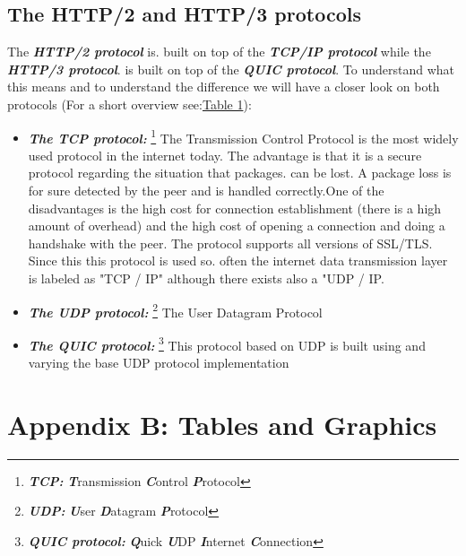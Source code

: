 \documentclass[10pt,a4paper,english]{article}
\newcommand{\abbrhighcol}[1]{\textbf{\textit{#1}}}
\begin{document}
\begin{multicols}{2}
\subsection{The HTTP/2 and HTTP/3 protocols}
\begin{flushleft}
The \abbrhighcol {HTTP/2 protocol} is. built on top of the \abbrhighcol {TCP/IP protocol} while the \abbrhighcol {HTTP/3 protocol}. is built on top of the \abbrhighcol{QUIC protocol}.
To understand what this means and to understand the difference we will have a closer look on both protocols (For a short overview see:\hyperref[tab:TCPvsUDP]{Table 1}): 
\begin{itemize}
\item{\abbrhighcol {The TCP protocol:} \footnote{\abbrhighcol {TCP: } \abbrhighcol {T}ransmission \abbrhighcol {C}ontrol \abbrhighcol {P}rotocol} The Transmission Control Protocol is the most widely used protocol in the internet today. \newline The advantage is that it is a  secure protocol regarding the situation that packages. can be lost. A package loss is for sure detected by the peer and is handled correctly.\newline One of the disadvantages is the high cost for connection establishment (there is a high amount of overhead) and the high cost of opening a connection and doing a handshake with the peer. The protocol supports all versions of SSL/TLS. Since this this protocol is used so. often the internet data transmission layer is labeled as "TCP / IP" although there exists also a "UDP / IP.} 
\item{\abbrhighcol{The UDP protocol:} \footnote{\abbrhighcol{UDP: }\abbrhighcol{U}ser \abbrhighcol{D}atagram \abbrhighcol{P}rotocol} The User Datagram Protocol}
\item{\abbrhighcol{The QUIC protocol:} \footnote{\abbrhighcol {QUIC protocol:} \abbrhighcol{Q}uick \abbrhighcol {U}DP \abbrhighcol{I}nternet \abbrhighcol{C}onnection} This protocol based on UDP is built using and varying the base UDP protocol implementation }
\end{itemize}
\end{flushleft}
\end{multicols}
\section{Appendix B: Tables and Graphics}
\end{document}
